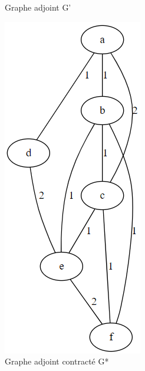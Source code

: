 \begin{figure}[H]
\begin{minipage}[b]{0.3\textwidth}
    \caption{Graphe adjoint G'}
    \label{linear_g_graph}
  \end{minipage}
  \hfill
  \begin{minipage}[b]{0.3\textwidth}
    \includegraphics[width=\textwidth]{imgs/w_line_graph.PNG}
    \caption{Graphe adjoint contracté G*}
    \label{w_line_graph}
  \end{minipage}
\end{figure}

